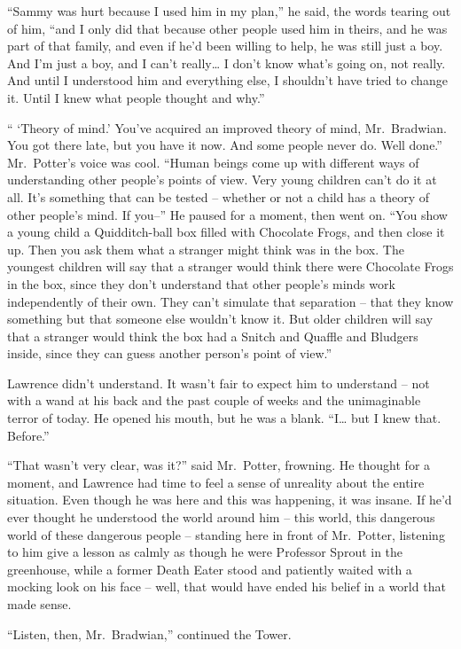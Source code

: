 ``Sammy was hurt because I used him in my plan,'' he said, the words
tearing out of him, ``and I only did that because other people used him
in theirs, and he was part of that family, and even if he'd been willing
to help, he was still just a boy. And I'm just a boy, and I can't
really\ldots{} I don't know what's going on, not really. And until I
understood him and everything else, I shouldn't have tried to change it.
Until I knew what people thought and why.''

`` `Theory of mind.' You've acquired an improved theory of mind,
Mr.~Bradwian. You got there late, but you have it now. And some people
never do. Well done.'' Mr.~Potter's voice was cool. ``Human beings come
up with different ways of understanding other people's points of view.
Very young children can't do it at all. It's something that can be
tested -- whether or not a child has a theory of other people's mind. If
you--'' He paused for a moment, then went on. ``You show a young child a
Quidditch-ball box filled with Chocolate Frogs, and then close it up.
Then you ask them what a stranger might think was in the box. The
youngest children will say that a stranger would think there were
Chocolate Frogs in the box, since they don't understand that other
people's minds work independently of their own. They can't simulate that
separation -- that they know something but that someone else wouldn't
know it. But older children will say that a stranger would think the box
had a Snitch and Quaffle and Bludgers inside, since they can guess
another person's point of view.''

Lawrence didn't understand. It wasn't fair to expect him to understand
-- not with a wand at his back and the past couple of weeks and the
unimaginable terror of today. He opened his mouth, but he was a blank.
``I\ldots{} but I knew that. Before.''

``That wasn't very clear, was it?'' said Mr.~Potter, frowning. He
thought for a moment, and Lawrence had time to feel a sense of unreality
about the entire situation. Even though he was here and this was
happening, it was insane. If he'd ever thought he understood the world
around him -- this world, this dangerous world of these dangerous people
-- standing here in front of Mr.~Potter, listening to him give a lesson
as calmly as though he were Professor Sprout in the greenhouse, while a
former Death Eater stood and patiently waited with a mocking look on his
face -- well, that would have ended his belief in a world that made
sense.

``Listen, then, Mr.~Bradwian,'' continued the Tower.

